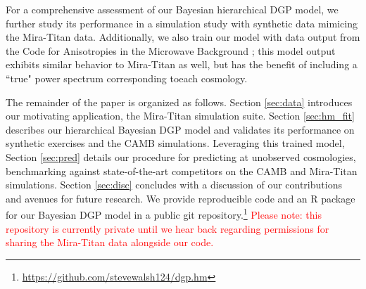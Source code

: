 \documentclass[11pt]{article}
\begin{document}
For a comprehensive assessment of our Bayesian hierarchical DGP model, we 
further study its performance in a simulation study with synthetic data mimicing 
the Mira-Titan data. Additionally, we also train our model with data output from 
the Code for Anisotropies in the Microwave Background \citep[CAMB,][]{lewis2011CAMB};
this model output exhibits similar behavior to Mira-Titan as well, but has the benefit 
of including a ``true" power spectrum corresponding toeach cosmology. 

The remainder of the paper is organized as follows.  Section \ref{sec:data} 
introduces our motivating application, the Mira-Titan simulation suite.  
Section \ref{sec:hm_fit} describes our hierarchical Bayesian DGP model and 
validates its performance on synthetic exercises and the CAMB simulations.  
Leveraging this trained model, Section \ref{sec:pred} details 
our procedure for predicting at unobserved cosmologies, benchmarking against
state-of-the-art competitors on the CAMB and Mira-Titan simulations. 
Section \ref{sec:disc} concludes with a discussion of our contributions and avenues for 
future research.  We provide reproducible code and an R package for our Bayesian DGP model
in a public git repository.\footnote{\url{https://github.com/stevewalsh124/dgp.hm}}
\textcolor{red}{Please note: this repository is currently private until we 
hear back regarding permissions for sharing the Mira-Titan data alongside our code.}


\end{document}

